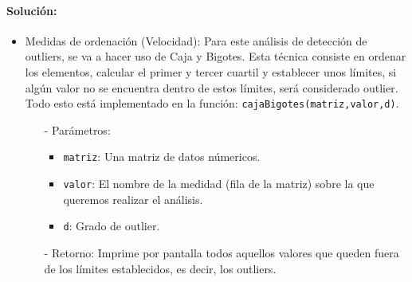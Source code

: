 \documentclass[a4paper, 12pt]{article}
\begin{document}
		\paragraph{Solución:}
		\begin{itemize}
			\item Medidas de ordenación (Velocidad): Para este análisis de detección de outliers, se va a hacer uso de Caja y Bigotes. Esta técnica consiste en ordenar los elementos, calcular el primer y tercer cuartil y establecer unos límites, si algún valor no se encuentra dentro de estos límites, será considerado outlier. \\ Todo esto está implementado en la función: \texttt{cajaBigotes(matriz,valor,d)}.
			\begin{itemize}
				\item[-] Parámetros:
				\begin{itemize}
					\item \texttt{matriz}: Una matriz de datos númericos.
					\item \texttt{valor}: El nombre de la medidad (fila de la matriz) sobre la que queremos realizar el análisis.
					\item \texttt{d}: Grado de outlier.
				\end{itemize}
				
				\item[-] Retorno: Imprime por pantalla todos aquellos valores que queden fuera de los límites establecidos, es decir, los outliers.
				

\end{itemize}
\end{itemize}
\end{document}
